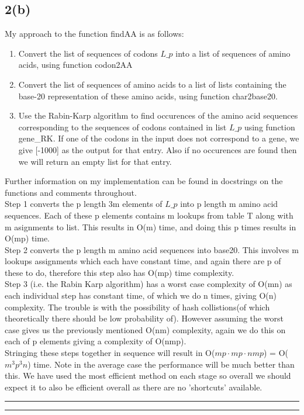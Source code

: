 \documentclass{article}
\begin{document}
\subsection*{2(b)}
My approach to the function findAA is as follows:
\begin{enumerate}
\item Convert the list of sequences of codons $L\_p$ into a list of sequences of amino acids, using function codon2AA
\item Convert the list of sequences of amino acids to a list of lists containing the base-20 representation of these amino acids, using function char2base20.
\item Use the Rabin-Karp algorithm to find occurences of the amino acid sequences corresponding to the sequences of codons contained in list $L\_p$ using function gene\_RK. If one of the codons in the input does not correspond to a gene, we give [-1000] as the output for that entry. Also if no occurences are found then we will return an empty list for that entry.
\end{enumerate}
Further information on my implementation can be found in docstrings on the functions and comments throughout.\\

Step 1 converts the p length 3m elements of $L\_p$ into p length m amino acid sequences. Each of these p elements contains m lookups from table T along with m asignments to list. This results in O(m) time, and doing this p times results in O(mp) time. \\

Step 2 converts the p length m amino acid sequences into base20. This involves m lookups assignments which each have constant time, and again there are p of these to do, therefore this step also has O(mp) time complexity. \\

Step 3 (i.e. the Rabin Karp algorithm) has a worst case complexity of O(mn) as each individual step has constant time, of which we do n times, giving O(n) complexity. The trouble is with the possibility of hash collistions(of which theoretically there should be low probability of). However assuming the worst case gives us the previously mentioned O(nm) complexity, again we do this on each of p elements giving a complexity of O(nmp). \\

Stringing these steps together in sequence will result in O($mp \cdot mp \cdot nmp$) = O($m^{3}p^{3}n$) time. Note in the average case the performance will be much better than this. We have used the most efficient method on each stage so overall we should expect it to also be efficient overall as there are no 'shortcuts' available.







\hrule
\hrule



\end{document}
